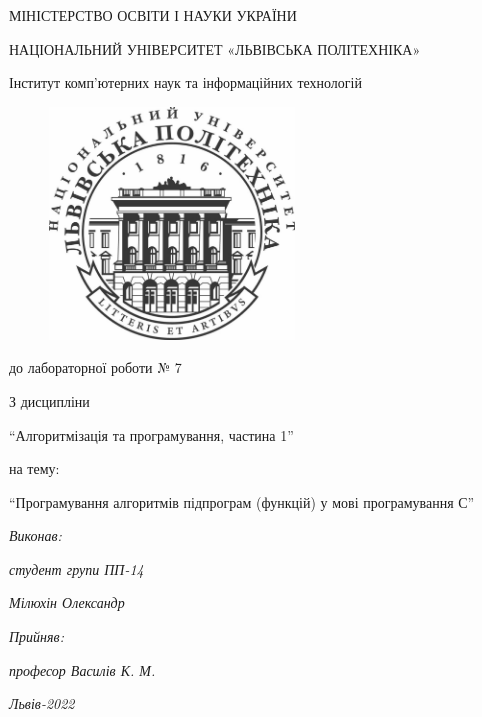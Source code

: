 \begin{titlepage}
\pagestyle{empty}
\begin{center}

	{\fontsize{14}{24}\selectfont МІНІСТЕРСТВО ОСВІТИ І НАУКИ УКРАЇНИ

	НАЦІОНАЛЬНИЙ УНІВЕРСИТЕТ «ЛЬВІВСЬКА ПОЛІТЕХНІКА»

	Інститут комп'ютерних наук та інформаційних технологій

	}

	\vspace{90.4pt} %
	\begin{figure}[h]
		\centering
		\includegraphics[width=6.5cm,keepaspectratio]{../../../lpnu.png}
	\end{figure}

	{\fontsize{18}{29}\selectfont{Звіт}

	{до лабораторної роботи № 7}

	{З дисципліни}

	{``Алгоритмізація та програмування, частина 1''}

	{на тему:}

	{``Програмування алгоритмів підпрограм (функцій) у мові програмування С''}

	}
\end{center}

\vspace{12.1pt} %
	{\fontsize{14}{22.4}\selectfont
\begin{flushright}
	\textit{Виконав:}

	\textit{студент групи ПП-14}

	\textit{Мілюхін Олександр}

	\textit{Прийняв:}

	\textit{професор Василів К. М.}
\end{flushright}
\vspace{37.4pt} %
\begin{center}
\textit{Львів-2022}
\end{center}
	}
\end{titlepage}
